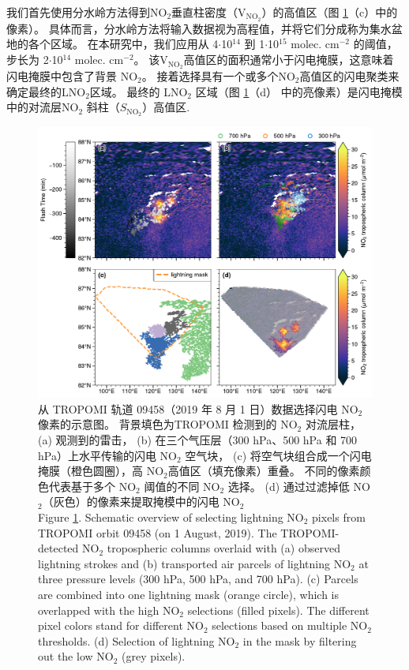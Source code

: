 我们首先使用分水岭方法得到NO$_2$垂直柱密度（V$_{\textrm{NO$_2$}}$）的高值区（图 \ref{fig:workflow}（c）中的像素）。
具体而言，分水岭方法将输入数据视为高程值，并将它们分成称为集水盆地的各个区域\citep{Soille.1990,Heikenfeld.2019a}。
在本研究中，我们应用从 4$\cdot$10$^{14}$ 到 1$\cdot$10$^{15}$ molec. cm$^{-2}$ 的阈值，步长为 2$\cdot$10$^{14}$ molec. cm$^{-2}$。
该V$_{\textrm{NO$_2$}}$高值区的面积通常小于闪电掩膜，这意味着闪电掩膜中包含了背景 NO$_2$。
接着选择具有一个或多个NO$_2$高值区的闪电聚类来确定最终的LNO$_2$区域。
最终的 LNO$_2$ 区域（图 \ref{fig:workflow}（d） 中的亮像素）是闪电掩模中的对流层NO$_2$ 斜柱（$S_{\textrm{NO$_2$}}$）高值区.

\begin{figure}[htbp]
\centering
\includegraphics[width=14cm]{./figures/workflow.pdf}
\caption{
从 TROPOMI 轨道 09458（2019 年 8 月 1 日）数据选择闪电 NO$_2$ 像素的示意图。
背景填色为TROPOMI 检测到的 NO$_2$ 对流层柱， (a) 观测到的雷击，
(b) 在三个气压层（300 hPa、500 hPa 和 700 hPa）上水平传输的闪电 NO$_2$ 空气块，
(c) 将空气块组合成一个闪电掩膜（橙色圆圈），高 NO$_2$高值区（填充像素）重叠。
不同的像素颜色代表基于多个 NO$_2$ 阈值的不同 NO$_2$ 选择。
(d) 通过过滤掉低 NO$_2$（灰色）的像素来提取掩模中的闪电 NO$_2$\\
Figure \ref{fig:workflow}. Schematic overview of selecting lightning NO$_2$ pixels from TROPOMI orbit 09458 (on 1 August, 2019).
The TROPOMI-detected NO$_2$ tropospheric columns overlaid with (a) observed lightning strokes and
(b) transported air parcels of lightning NO$_2$ at three pressure levels (300 hPa, 500 hPa, and 700 hPa).
(c) Parcels are combined into one lightning mask (orange circle), which is overlapped with the high NO$_2$ selections (filled pixels). The different pixel colors stand for different NO$_2$ selections based on multiple NO$_2$ thresholds.
(d) Selection of lightning NO$_2$ in the mask by filtering out the low NO$_2$ (grey pixels).
}
\label{fig:workflow}
\end{figure}

